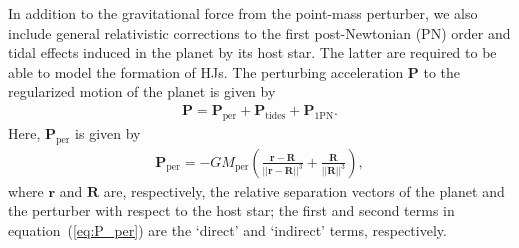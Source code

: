 \documentclass[iop,usenatbib]{emulateapj}
\newcommand{\ve}[1]{\boldsymbol{#1}}
\newcommand{\mper}{M_\mathrm{per}}
\begin{document}
In addition to the gravitational force from the point-mass perturber, we also include general relativistic corrections to the first post-Newtonian (PN) order and tidal effects induced in the planet by its host star. The latter are required to be able to model the formation of HJs. The perturbing acceleration $\ve{P}$ to the regularized motion of the planet is given by
\begin{align}
\label{eq:P}
\ve{P} = \ve{P}_\mathrm{per} + \ve{P}_\mathrm{tides} + \ve{P}_\mathrm{1PN}.
\end{align}
Here, $\ve{P}_\mathrm{per}$ is given by
\begin{align}
\label{eq:P_per}
\ve{P}_\mathrm{per} = -G \mper \left ( \frac{ \ve{r} - \ve{R}}{||\ve{r}-\ve{R}||^3} + \frac{\ve{R}}{||\ve{R}||^3} \right ),
\end{align}
where $\ve{r}$ and $\ve{R}$ are, respectively, the relative separation vectors of the planet and the perturber with respect to the host star; the first and second terms in equation~(\ref{eq:P_per}) are the `direct' and `indirect' terms, respectively. 
\end{document}
